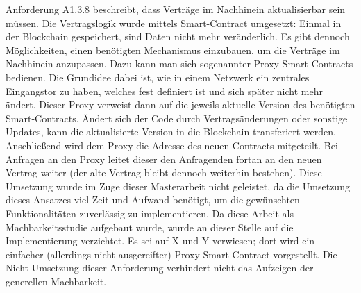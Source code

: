 Anforderung A1.3.8 beschreibt, dass Verträge im Nachhinein aktualisierbar sein müssen. Die Vertragslogik wurde mittels Smart-Contract umgesetzt: Einmal in der Blockchain gespeichert, sind Daten nicht mehr veränderlich. Es gibt dennoch Möglichkeiten, einen benötigten Mechanismus einzubauen, um die Verträge im Nachhinein anzupassen. Dazu kann man sich sogenannter Proxy-Smart-Contracts bedienen. Die Grundidee dabei ist, wie in einem Netzwerk ein zentrales Eingangstor zu haben, welches fest definiert ist und sich später nicht mehr ändert. Dieser Proxy verweist dann auf die jeweils aktuelle Version des benötigten Smart-Contracts. Ändert sich der Code durch Vertragsänderungen oder sonstige Updates, kann die aktualisierte Version in die Blockchain transferiert werden. Anschließend wird dem Proxy die Adresse des neuen Contracts mitgeteilt. Bei Anfragen an den Proxy leitet dieser den Anfragenden fortan an den neuen Vertrag weiter (der alte Vertrag bleibt dennoch weiterhin bestehen). Diese Umsetzung wurde im Zuge dieser Masterarbeit nicht geleistet, da die Umsetzung dieses Ansatzes viel Zeit und Aufwand benötigt, um die gewünschten Funktionalitäten zuverlässig zu implementieren. Da diese Arbeit als Machbarkeitsstudie aufgebaut wurde, wurde an dieser Stelle auf die Implementierung verzichtet. Es sei auf X und Y verwiesen; dort wird ein einfacher (allerdings nicht ausgereifter) Proxy-Smart-Contract vorgestellt. Die Nicht-Umsetzung dieser Anforderung verhindert nicht das Aufzeigen der generellen Machbarkeit.\\
